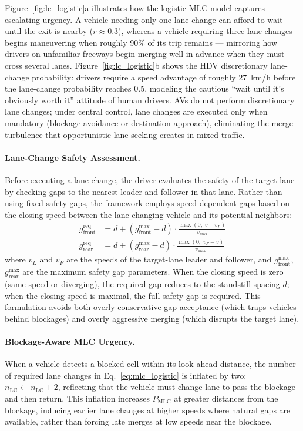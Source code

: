 \documentclass[review,authoryear]{elsarticle}
\begin{document}
Figure~\ref{fig:lc_logistic}a illustrates how the logistic MLC model captures escalating urgency. A vehicle needing only one lane change can afford to wait until the exit is nearby ($r \approx 0.3$), whereas a vehicle requiring three lane changes begins maneuvering when roughly 90\% of its trip remains --- mirroring how drivers on unfamiliar freeways begin merging well in advance when they must cross several lanes. Figure~\ref{fig:lc_logistic}b shows the HDV discretionary lane-change probability: drivers require a speed advantage of roughly 27~km/h before the lane-change probability reaches 0.5, modeling the cautious ``wait until it's obviously worth it'' attitude of human drivers. AVs do not perform discretionary lane changes; under central control, lane changes are executed only when mandatory (blockage avoidance or destination approach), eliminating the merge turbulence that opportunistic lane-seeking creates in mixed traffic.

\paragraph{Lane-Change Safety Assessment.}
Before executing a lane change, the driver evaluates the safety of the target lane by checking gaps to the nearest leader and follower in that lane. Rather than using fixed safety gaps, the framework employs speed-dependent gaps based on the closing speed between the lane-changing vehicle and its potential neighbors:
\begin{align}
    g_{\text{front}}^{\text{req}} &= d + (g_{\text{front}}^{\max} - d) \cdot \frac{\max(0,\; v - v_L)}{v_{\max}} \label{eq:front_gap} \\
    g_{\text{rear}}^{\text{req}} &= d + (g_{\text{rear}}^{\max} - d) \cdot \frac{\max(0,\; v_F - v)}{v_{\max}} \label{eq:rear_gap}
\end{align}
where $v_L$ and $v_F$ are the speeds of the target-lane leader and follower, and $g_{\text{front}}^{\max}$, $g_{\text{rear}}^{\max}$ are the maximum safety gap parameters. When the closing speed is zero (same speed or diverging), the required gap reduces to the standstill spacing $d$; when the closing speed is maximal, the full safety gap is required. This formulation avoids both overly conservative gap acceptance (which traps vehicles behind blockages) and overly aggressive merging (which disrupts the target lane).

\paragraph{Blockage-Aware MLC Urgency.}
When a vehicle detects a blocked cell within its look-ahead distance, the number of required lane changes in Eq.~\eqref{eq:mlc_logistic} is inflated by two: $n_{\text{LC}} \leftarrow n_{\text{LC}} + 2$, reflecting that the vehicle must change lane to pass the blockage and then return. This inflation increases $P_{\text{MLC}}$ at greater distances from the blockage, inducing earlier lane changes at higher speeds where natural gaps are available, rather than forcing late merges at low speeds near the blockage.
\end{document}
